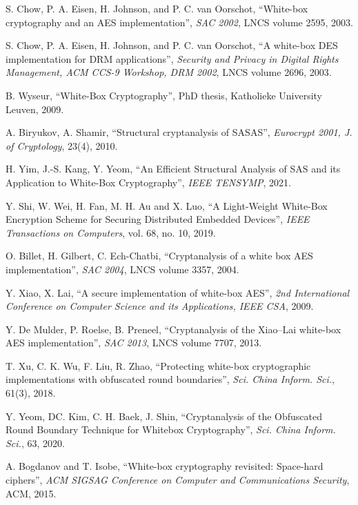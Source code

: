 \documentclass{ieeeaccess}
\begin{document}
\begin{thebibliography}{00}

S. Chow, P. A. Eisen, H. Johnson, and P. C. van Oorschot, 
``White-box cryptography and an AES implementation'', 
\emph{SAC 2002}, LNCS volume 2595, 2003. 

S. Chow, P. A. Eisen, H. Johnson, and P. C. van Oorschot, 
``A white-box DES implementation for DRM applications'', 
\emph{Security and Privacy in Digital Rights Management, ACM CCS-9 Workshop, DRM 2002}, LNCS volume 2696, 2003.

B. Wyseur, 
``White-Box Cryptography'', 
PhD thesis, Katholieke University Leuven, 2009.

A. Biryukov, A. Shamir, 
``Structural cryptanalysis of SASAS'', 
\emph{Eurocrypt 2001, J. of Cryptology}, 23(4), 2010.

H. Yim, J.-S. Kang, Y. Yeom, 
``An Efficient Structural Analysis of SAS and its Application to White-Box Cryptography'', 
\emph{IEEE TENSYMP}, 2021.

Y. Shi, W. Wei, H. Fan, M. H. Au and X. Luo, 
``A Light-Weight White-Box Encryption Scheme for Securing Distributed Embedded Devices'', 
\emph{IEEE Transactions on Computers}, vol. 68, no. 10, 2019.

O. Billet, H. Gilbert, C. Ech-Chatbi, 
``Cryptanalysis of a white box AES implementation'', 
\emph{SAC 2004}, LNCS volume 3357, 2004.

Y. Xiao, X. Lai, 
``A secure implementation of white-box AES'', 
\emph{2nd International Conference on Computer Science and its Applications, IEEE CSA}, 2009.

Y. De Mulder, P. Roelse, B. Preneel, 
``Cryptanalysis of the Xiao–Lai white-box AES implementation'',
\emph{SAC 2013}, LNCS volume 7707, 2013.

T. Xu, C. K. Wu, F. Liu, R. Zhao, 
``Protecting white-box cryptographic implementations with obfuscated round boundaries'', 
\emph{Sci. China Inform. Sci.}, 61(3), 2018.

Y. Yeom, DC. Kim, C. H. Baek, J. Shin, 
``Cryptanalysis of the Obfuscated Round Boundary Technique for Whitebox Cryptography'', 
\emph{Sci. China Inform. Sci.}, 63, 2020.

A. Bogdanov and T. Isobe, 
``White-box cryptography revisited: Space-hard ciphers'', 
\emph{ACM SIGSAG Conference on Computer and Communications Security}, ACM, 2015.


\end{thebibliography}
\end{document}
